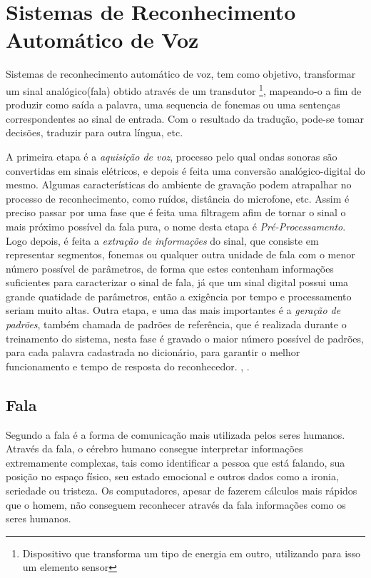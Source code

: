 \chapter{Sistemas de Reconhecimento Automático de Voz}

Sistemas de reconhecimento automático de voz, tem como objetivo, transformar um sinal analógico(fala) obtido através de um transdutor \footnote{ Dispositivo que transforma um tipo de energia em outro, utilizando para isso um elemento sensor}, mapeando-o a fim de produzir como saída a palavra, uma sequencia de fonemas ou uma sentenças correspondentes ao sinal de entrada. Com o resultado da tradução, pode-se tomar decisões, traduzir para outra língua, etc.

A primeira etapa é a \textit{aquisição de voz}, processo pelo qual ondas sonoras são convertidas em sinais elétricos, e depois é feita uma conversão analógico-digital do mesmo. Algumas características do ambiente de gravação podem atrapalhar no processo de reconhecimento, como ruídos, distância do microfone, etc. Assim é preciso passar por uma fase que é feita uma filtragem afim de tornar o sinal o mais próximo possível da fala pura, o nome desta etapa é \textit{Pré-Processamento}. Logo depois, é feita a \textit{extração de informações} do sinal, que consiste em representar segmentos, fonemas ou qualquer outra unidade de fala com o menor número possível de parâmetros, de forma que estes contenham informações suficientes para caracterizar o sinal de fala, já que um sinal digital possui uma grande quatidade de parâmetros, então a exigência por tempo e processamento seriam muito altas. Outra etapa, e uma das mais importantes é a \textit{geração de padrões}, também chamada de padrões de referência, que é realizada durante o treinamento do sistema, nesta fase é gravado o maior número possível de padrões, para cada palavra cadastrada no dicionário, para garantir o melhor funcionamento e tempo de resposta do reconhecedor.
\cite{RavIsolAnderson}, \cite{RavComputLouzada}. 


\section{Fala}
Segundo  a fala é a forma de comunicação mais utilizada pelos seres humanos. Através da fala, o cérebro humano consegue interpretar informações extremamente complexas, tais como identificar a pessoa que está falando, sua posição no espaço físico, seu estado emocional e outros dados como a ironia, seriedade ou tristeza. Os computadores, apesar de fazerem cálculos mais rápidos que o homem, não conseguem reconhecer através da fala informações como os seres humanos.

